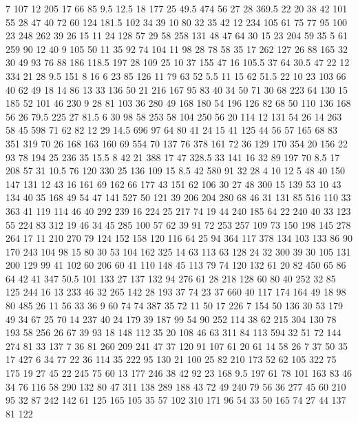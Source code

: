 7
107
12
205
17
66
85
9.5
12.5
18
177
25
49.5
474
56
27
28
369.5
22
20
38
42
101
55
28
47
40
72
60
124
181.5
102
34
39
10
80
32
35
42
12
234
105
61
75
77
95
100
23
248
262
39
26
15
11
24
128
57
29
58
258
131
48
47
64
30
15
23
204
59
35
5
61
259
90
12
40
9
105
50
11
35
92
74
104
11
98
28
78
58
35
17
262
127
26
88
165
32
30
49
93
76
88
186
118.5
197
28
109
25
10
37
155
47
16
105.5
37
64
30.5
47
22
12
334
21
28
9.5
151
8
16
6
23
85
126
11
79
63
52
5.5
11
15
62
51.5
22
10
23
103
66
40
62
49
18
14
86
13
33
136
50
21
216
167
95
83
40
34
50
71
30
68
223
64
130
15
185
52
101
46
230
9
28
81
103
36
280
49
168
180
54
196
126
82
68
50
110
136
168
56
26
79.5
225
27
81.5
6
30
98
58
253
58
104
250
56
20
114
12
131
54
26
14
263
58
45
598
71
62
82
12
29
14.5
696
97
64
80
41
24
15
41
125
44
56
57
165
68
83
351
319
70
26
168
163
160
69
554
70
137
76
378
161
72
36
129
170
354
20
156
22
93
78
194
25
236
35
15.5
8
42
21
388
17
47
328.5
33
141
16
32
89
197
70
8.5
17
208
57
31
10.5
76
120
330
25
136
109
15
8.5
42
580
91
32
28
4
10
12
5
48
40
150
147
131
12
43
16
161
69
162
66
177
43
151
62
106
30
27
48
300
15
139
53
10
43
134
40
35
168
49
54
47
141
527
50
121
39
206
204
280
68
46
31
131
85
516
110
33
363
41
119
114
46
40
292
239
16
224
25
217
74
19
44
240
185
64
22
240
40
33
123
55
224
83
312
19
46
34
45
285
100
57
62
39
91
72
253
257
109
73
150
198
145
278
264
17
11
210
270
79
124
152
158
120
116
64
25
94
364
117
378
134
103
133
86
90
170
243
104
98
15
80
30
53
104
162
325
14
63
113
63
128
24
32
300
39
30
105
131
200
129
99
41
102
60
206
60
41
110
148
45
113
79
74
120
132
61
20
82
450
65
86
64
42
41
347
50.5
101
133
27
137
132
94
276
61
28
218
128
60
80
40
252
32
85
125
244
16
13
233
46
32
265
142
28
193
37
74
23
37
660
40
117
174
164
49
18
98
80
485
26
11
56
33
36
9
60
74
74
387
35
72
11
50
17
226
7
154
50
136
30
53
179
49
34
67
25
70
14
237
40
24
179
39
187
99
54
90
252
114
38
62
215
304
130
78
193
58
256
26
67
39
93
18
148
112
35
20
108
46
63
311
84
113
594
32
51
72
144
274
81
33
137
7
36
81
260
209
241
47
37
120
91
107
61
20
61
14
58
26
7
37
50
35
17
427
6
34
77
22
36
114
35
222
95
130
21
100
25
82
210
173
52
62
105
322
75
175
19
27
45
22
245
75
60
13
177
246
38
42
92
23
168
9.5
197
61
78
101
163
83
46
34
76
116
58
290
132
80
47
311
138
289
188
43
72
49
240
79
56
36
277
45
60
210
95
32
87
242
142
61
125
165
105
35
57
102
310
171
96
54
33
50
165
74
27
44
137
81
122

